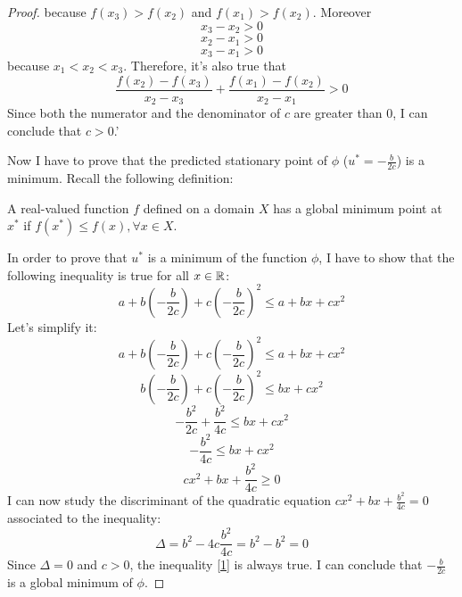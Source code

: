 \begin{proof}
    because \(f(x_3)>f(x_2)\) and \(f(x_1)>f(x_2)\). Moreover
    \[x_3-x_2>0\]
    \[x_2-x_1>0\]
    \[x_3-x_1>0\]
    because \(x_1<x_2<x_3\). Therefore, it's also true that
    \[\frac{f(x_2) - f(x_3)}{x_2 - x_3} + \frac{f(x_1)-f(x_2)}{x_2-x_1}>0\]
    Since both the numerator and the denominator of \(c\) are greater than \(0\), I can conclude that \(c>0\).'\par
    Now I have to prove that the predicted stationary point of \(\phi\) (\(u^* = -\frac{b}{2c}\)) is a minimum. Recall the following definition:
    \begin{definition}
        A real-valued function \(f\) defined on a domain \(X\) has a global minimum point at \(x^*\) if \(f(x^*)\leq f(x), \forall x \in X\).
    \end{definition}
    In order to prove that \(u^*\) is a minimum of the function \(\phi\), I have to show that the following inequality is true for all \(x \in \mathbb{R}\):
    \[a + b\left(-\frac{b}{2c}\right) + c\left(-\frac{b}{2c}\right)^2 \leq a + bx + cx^2\]
    Let's simplify it:
    \[a + b\left(-\frac{b}{2c}\right) + c\left(-\frac{b}{2c}\right)^2 \leq a + bx + cx^2\]
    \[b\left(-\frac{b}{2c}\right) + c\left(-\frac{b}{2c}\right)^2 \leq bx + cx^2\]
    \[-\frac{b^2}{2c} + \frac{b^2}{4c} \leq bx + cx^2\]
    \[-\frac{b^2}{4c} \leq bx + cx^2\]
    \begin{equation}\label{1}
        cx^2 + bx + \frac{b^2}{4c} \geq 0
    \end{equation}
    I can now study the discriminant of the quadratic equation \(cx^2 + bx + \frac{b^2}{4c} = 0\) associated to the inequality:
    \[\Delta = b^2 - 4c\frac{b^2}{4c} = b^2 - b^2 = 0\]
    Since \(\Delta = 0\) and \(c>0\), the inequality \eqref{1} is always true. I can conclude that \(-\frac{b}{2c}\) is a global minimum of \(\phi\).
\end{proof}